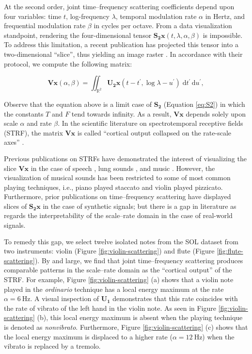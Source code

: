 \documentclass{bmcart}
\begin{document}
At the second order, joint time--frequency scattering coefficients depend upon four variables: time $t$, log-frequency $\lambda$, temporal modulation rate $\alpha$ in Hertz, and frequential modulation rate $\beta$ in cycles per octave.
From a data visualization standpoint, rendering the four-dimensional tensor $\mathbf{S_2}\boldsymbol{x}(t, \lambda, \alpha, \beta)$ is impossible.
To address this limitation, a recent publication has projected this tensor into a two-dimensional ``slice'', thus yielding an image raster \cite{anden2019tsp}.
In accordance with their protocol, we compute the following matrix:

\begin{equation}
\mathbf{V}\boldsymbol{x}(\alpha, \beta) =
\iint_{\mathbb{R}^2}
\mathbf{U_2}\boldsymbol{x}(t - t^\prime, \log \lambda - u^\prime)
\;\mathrm{d}t^\prime \, \mathrm{d}u^\prime,
\end{equation}

Observe that the equation above is a limit case of $\mathbf{S_2}$ (Equation \ref{eq:S2}) in which the constants $T$ and $F$ tend towards infinity.
As a result, $\mathbf{V}\boldsymbol{x}$ depends solely upon scale $\alpha$ and rate $\beta$.
In the scientific literature on spectrotemporal receptive fields (STRF), the matrix $\mathbf{V}\boldsymbol{x}$ is called ``cortical output collapsed on the rate-scale axes'' \cite{elhilali2003speechcomm}.

Previous publications on STRFs have demonstrated the interest of visualizing the slice $\mathbf{V}\boldsymbol{x}$ in the case of speech \cite{bellur2015ciss}, lung sounds \cite{emmanouilidou2012embs}, and music \cite{patil2012ploscompbiol}.
However, the visualization of musical sounds has been restricted to some of most common playing techniques, i.e., piano played staccato and violin played pizzicato.
Furthermore, prior publications on time--frequency scattering have displayed slices of $\mathbf{S_2}\boldsymbol{x}$ in the case of synthetic signals; but there is a gap in literature as regards the interpretability of the scale--rate domain in the case of real-world signals.

To remedy this gap, we select twelve isolated notes from the SOL dataset from two instruments: violin (Figure \ref{fig:violin-scattering}) and flute (Figure \ref{fig:flute-scattering}).
By and large, we find that joint time--frequency scattering produces comparable patterns in the scale--rate domain as the ``cortical output'' of the STRF.
For example, Figure \ref{fig:violin-scattering} (a) shows that a violin note played in the \emph{ordinario} technique has a local energy maximum at the rate $\alpha = \SI{6}{\hertz}$.
A visual inspection of $\mathbf{U_1}$ demonstrates that this rate coincides with the rate of vibrato of the left hand in the violin note.
As seen in Figure \ref{fig:violin-scattering} (b), this local energy maximum is absent when the playing technique is denoted as \emph{nonvibrato}.
Furthermore, Figure \ref{fig:violin-scattering} (c) shows that the local energy maximum is displaced to a higher rate ($\alpha = \SI{12}{\hertz}$) when the vibrato is replaced by a tremolo.
\end{document}
